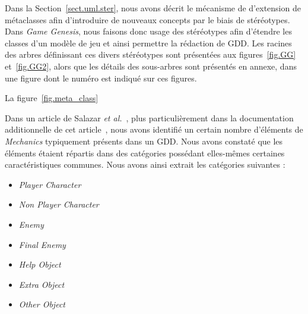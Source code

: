 Dans la Section~\ref{sect.uml.ster}, nous avons décrit le mécanisme de d'extension de m\'etaclasses afin d'introduire de nouveaux concepts par le biais de stéréotypes. 
Dans \emph{Game Genesis}, nous faisons donc usage des stéréotypes afin d'étendre les classes d'un modèle de jeu et ainsi permettre la rédaction de GDD.
%
Les racines des arbres définissant ces divers stéréotypes sont
présentées aux figures~\ref{fig.GG} et~\ref{fig.GG2}, alors que les
détails des sous-arbres sont présentés en annexe, dans une figure
dont le numéro est indiqué sur ces figures.

La figure~\ref{fig.meta_class} 



Dans un article de Salazar \emph{et al.}~\cite{GDD_software}, plus particulièrement dans la documentation additionnelle de cet article~\cite{salazar_gdd}, nous avons identifié un certain nombre d'\'el\'ements de \emph{Mechanics} typiquement présents dans un GDD.
Nous avons constaté que les éléments étaient répartis dans des catégories possédant elles-mêmes certaines caractéristiques communes. 
Nous avons ainsi extrait les catégories suivantes :

\begin{itemize}
    \item \emph{Player Character}
    \item \emph{Non Player Character}
    \item \emph{Enemy}
    \item \emph{Final Enemy}
    \item \emph{Help Object}
    \item \emph{Extra Object}
    \item \emph{Other Object}
\end{itemize}



